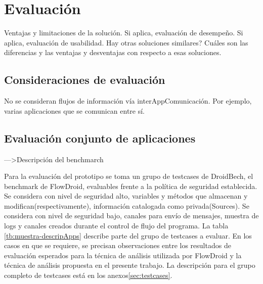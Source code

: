 \label{ch:evaluacion}
\chapter{Evaluación}
Ventajas y limitaciones de la solución.\newline 
Si aplica, evaluación de desempeño.  \newline 
Si aplica, evaluación de usabilidad.  
Hay otras soluciones similares? \newline 
Cuáles son las diferencias y las ventajas y desventajas con respecto a esas soluciones.

\section{Consideraciones de evaluación}
No se consideran flujos de información vía interAppComunicación. Por ejemplo,
varias aplicaciones que se comunican entre sí.

\section{Evaluación conjunto de aplicaciones}
--->Descripción del benchmarch\newline

Para la evaluación del prototipo se toma un grupo de testcases de DroidBech, el
benchmark de FlowDroid, evaluables frente a la política de seguridad
establecida.\newline 
Se considera con nivel de seguridad alto, variables y métodos que almacenan y
modifican(respectivamente), información catalogada como privada(Sources).\newline 
Se considera con nivel de seguridad bajo, canales para envío de mensajes,
muestra de logs y canales creados durante el control de flujo del programa.\newline 
La tabla \ref{tb:muestra-descripApps} describe parte del grupo de testcases a
evaluar. En los casos en que se requiere, se precisan observaciones entre los
resultados de evaluación esperados para la técnica de análisis utilizada por
FlowDroid y la técnica de análisis propuesta en el presente trabajo.\newline 
La descripción para el grupo completo de testcases está en los anexos\ref{sec:testcases}.

